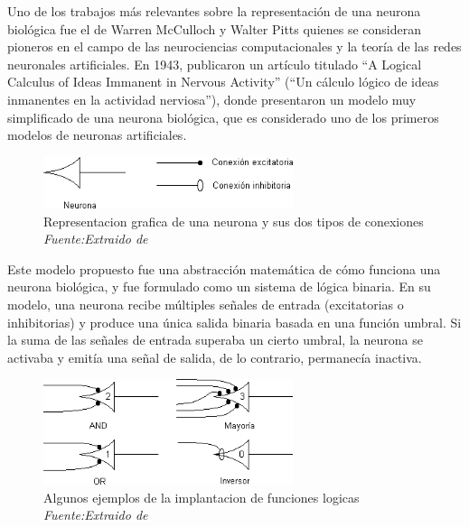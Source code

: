 Uno de los trabajos más relevantes sobre la representación de una neurona biológica fue el de Warren McCulloch y Walter Pitts quienes se consideran  pioneros en el campo de las neurociencias computacionales y la teoría de las redes neuronales artificiales. En 1943, publicaron un artículo titulado ``A Logical Calculus of Ideas Immanent in Nervous Activity'' (``Un cálculo lógico de ideas inmanentes en la actividad nerviosa''), donde presentaron un modelo muy simplificado de una neurona biológica, que es considerado uno de los primeros modelos de neuronas artificiales\cite{mcculloch1943logical}.

\begin{figure}
	\includegraphics[width=0.65\textwidth]{capitulo2/figuras/an2.png}
	\caption{Representacion grafica de una neurona y sus dos tipos de conexiones \\ \textit{Fuente:Extraido de \protect\cite[ p.4]{prieto2020modelo} }}
	\label{fig:an2}
\end{figure}

Este modelo propuesto  fue una abstracción matemática de cómo funciona una neurona biológica, y fue formulado como un sistema de lógica binaria. En su modelo, una neurona recibe múltiples señales de entrada (excitatorias o inhibitorias) y produce una única salida binaria basada en una función umbral. Si la suma de las señales de entrada superaba un cierto umbral, la neurona se activaba y emitía una señal de salida, de lo contrario, permanecía inactiva.

\begin{figure}[h!]
	\includegraphics[width=0.65\textwidth]{capitulo2/figuras/an3.png}
	\caption{Algunos ejemplos de la implantacion de funciones logicas \\ \textit{Fuente:Extraido de \protect\cite[p. 5]{prieto2020modelo}}  }
	\label{fig:an3}
\end{figure}

